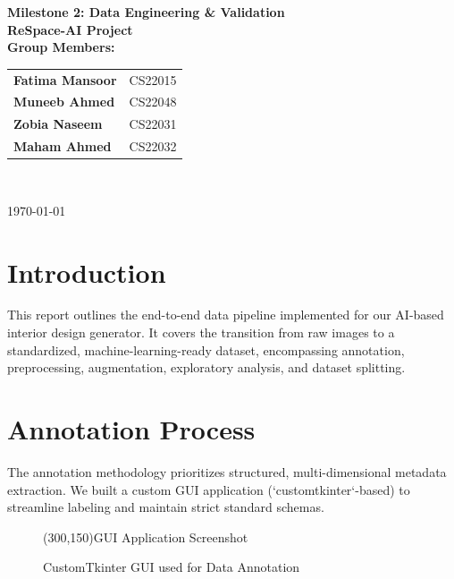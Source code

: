 \documentclass[11pt, a4paper]{article}
\begin{document}
\begin{titlepage}
    \centering
    \vspace*{3cm}
    
    {\Huge \textbf{Milestone 2: Data Engineering \& Validation}}\\[1.5cm]
    {\huge \textbf{ReSpace-AI Project}}\\[2.5cm]
    
    {\Large \textbf{Group Members:}}\\[0.5cm]
    {\large
    \renewcommand{\arraystretch}{1.5}
    \begin{tabular}{lc}
        \textbf{Fatima Mansoor} & CS22015 \\
        \textbf{Muneeb Ahmed} & CS22048 \\
        \textbf{Zobia Naseem} & CS22031 \\
        \textbf{Maham Ahmed} & CS22032 \\
    \end{tabular}
    }\\[3cm]
    
    \vfill
    
    {\Large \today}
\end{titlepage}

\tableofcontents
\newpage

\section{Introduction}
This report outlines the end-to-end data pipeline implemented for our AI-based interior design generator. It covers the transition from raw images to a standardized, machine-learning-ready dataset, encompassing annotation, preprocessing, augmentation, exploratory analysis, and dataset splitting.

\section{Annotation Process}
The annotation methodology prioritizes structured, multi-dimensional metadata extraction. We built a custom GUI application (`customtkinter`-based) to streamline labeling and maintain strict standard schemas.

\begin{figure}[h!]
    \centering
    \framebox(300,150){\Large GUI Application Screenshot}
    \caption{CustomTkinter GUI used for Data Annotation}
    \label{fig:gui_annotation}
\end{figure}
\end{document}
